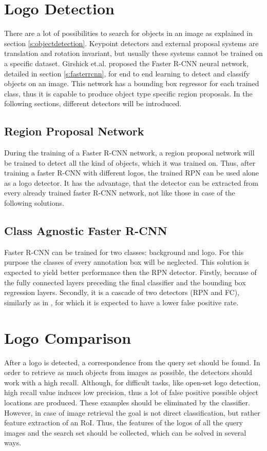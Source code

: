 \section{Logo Detection}\label{s:logodetection}
There are a lot of possibilities to search for objects in an image as explained in section \ref{s:objectdetection}. Keypoint detectors and external proposal systems are translation and rotation invariant, but usually these systems cannot be trained on a specific dataset. Girshick et.al. proposed the Faster R-CNN neural network, detailed in section \ref{s:fasterrcnn}, for end to end learning to detect and classify objects on an image. This network has a bounding box regressor for each trained class, thus it is capable to produce object type specific region proposals.
\bigbreak
In the following sections, different detectors will be introduced.
\bigbreak
\subsection{Region Proposal Network}
During the training of a Faster R-CNN network, a region proposal network will be trained to detect all the kind of objects, which it was trained on. Thus, after training a faster R-CNN with different logos, the trained RPN can be used alone as a logo detector. It has the advantage, that the detector can be extracted from every already trained faster R-CNN network, not like those in case of the following solutions.
\bigbreak
\subsection{Class Agnostic Faster R-CNN}\label{ss:classagnosticdetector}
Faster R-CNN can be trained for two classes: background and logo. For this purpose the classes of every annotation box will be neglected. This solution is expected to yield better performance then the RPN detector. Firstly, because of the fully connected layers preceding the final classifier and the bounding box regression layers. Secondly, it is a cascade of two detectors (RPN and FC), similarly as in \cite{Viola:2004:RRF:966432.966458}, for which it is expected to have a lower false positive rate.
\bigbreak
\section{Logo Comparison}\label{s:logocomparison}
After a logo is detected, a correspondence from the query set should be found. In order to retrieve as much objects from images as possible, the detectors should work with a high recall. Although, for difficult tasks, like open-set logo detection, high recall value induces low precision, thus a lot of false positive possible object locations are produced. These examples should be eliminated by the classifier.
\bigbreak
However, in case of image retrieval the goal is not direct classification, but rather feature extraction of an RoI. Thus, the features of the logos of all the query images and the search set should be collected, which can be solved in several ways.
\bigbreak
